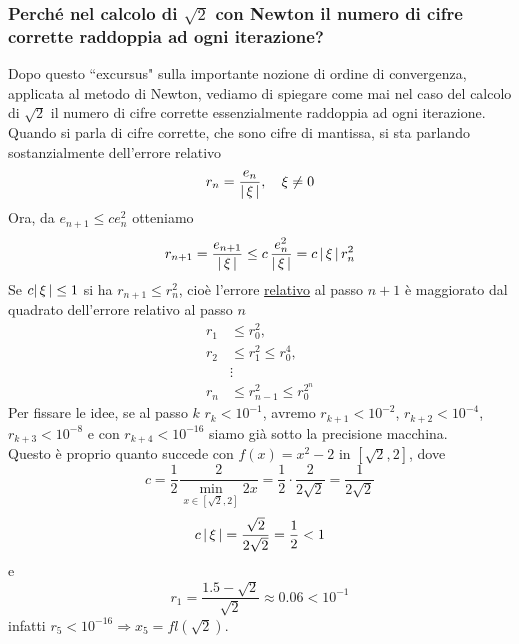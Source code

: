 \documentclass[12pt]{article}
\DeclarePairedDelimiter{\abs}{\lvert}{\rvert}
\begin{document}
\subsubsection{Perché nel calcolo di $\sqrt2$ con Newton il numero di cifre corrette raddoppia ad ogni iterazione?}
Dopo questo ``excursus" sulla importante nozione di ordine di convergenza, applicata al metodo di Newton, vediamo di spiegare come mai nel caso del calcolo di $\sqrt{2}$ il numero di cifre corrette essenzialmente raddoppia ad ogni iterazione.\\
Quando si parla di cifre corrette, che sono cifre di mantissa, si sta parlando sostanzialmente dell'errore relativo 
\[r_n = \frac{e_n}{\abs{\,\xi\,}}, \quad \xi \neq 0\]
Ora, da $e_{n+1} \leq ce_n^2$ otteniamo 
\[ r_{n+1} = \frac{e_{n+1}}{\abs{\,\xi\,}} \leq c\,\frac{e_n^2}{\abs{\,\xi\,}} = c\,\abs{\,\xi\,}\,r_n^2 \]
Se $c\abs{\,\xi\,} \leq 1$ si ha $r_{n+1} \leq r^2_n$, cioè l'errore \uline{relativo} al passo $n+1$ è maggiorato dal quadrato dell'errore relativo al passo $n$
\[\begin{split}
    r_1 & \leq r_0^2,\\
    r_2 & \leq r_1^2 \leq r_0^4,\\ 
    & \vdots \\ 
    r_n & \leq r_{n-1}^2 \leq r_0^{2^n}
\end{split}\]
Per fissare le idee, se al passo $k$ $r_k < 10^{-1}$, avremo $r_{k+1} < 10^{-2}$, $r_{k+2} < 10^{-4}$, $r_{k+3} < 10^{-8}$ e con $r_{k+4} < 10^{-16}$ siamo già sotto la precisione macchina. \\
Questo è proprio quanto succede con $f(x) = x^2 - 2$ in $[\sqrt{2},2]$, dove 
\[ c = \frac{1}{2}\frac{2}{\underset{x \in [\sqrt{2},2]}{\min}2x}  = \frac{1}{2} \cdot \frac{2}{2\sqrt{2}} = \frac{1}{2\sqrt{2}} \]
\[c\,\abs{\,\xi\,} = \frac{\sqrt{2}}{2\sqrt{2}} = \frac{1}{2} < 1\]
e
\[ r_1 = \frac{1.5 - \sqrt{2}}{\sqrt{2}} \approx 0.06 < 10^{-1} \]
infatti $r_5 < 10^{-16} \Rightarrow x_5 = fl(\sqrt{2})$.
\end{document}
